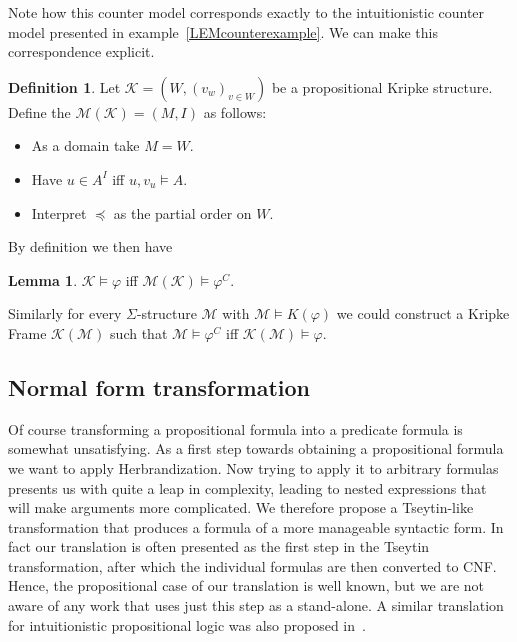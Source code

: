 \documentclass[a4paper,12pt]{report}
\theoremstyle{definition}
\theoremstyle{definition}
\theoremstyle{definition}
\newtheorem{lemma}[theorem]{Lemma}
\theoremstyle{definition}
\theoremstyle{definition}
\newtheorem{definition}[theorem]{Definition}
\theoremstyle{definition}
\theoremstyle{definition}
\begin{document}
	Note how this counter model corresponds exactly to the intuitionistic counter model presented in example~\ref{LEMcounterexample}. We can make this correspondence explicit.
	
	\begin{definition}
		Let $\mathcal K = (W, (v_w)_{v\in W})$ be a propositional Kripke structure. Define the $\mathcal M(\mathcal K) = (M, I)$ as follows:
		\begin{itemize}
			\item As a domain take $M = W$.
			\item Have $u\in A^{I}$ iff $u, v_u\models A$.
			\item Interpret $\preceq$ as the partial order on $W$.
		\end{itemize}
	\end{definition}

	\noindent By definition we then have
	\begin{lemma}
		$\mathcal K\models \varphi$ iff $\mathcal M(\mathcal K)\models \varphi^{C}$.
	\end{lemma}
	
	\indent Similarly for every $\Sigma$-structure $\mathcal M$ with $\mathcal M\models K(\varphi)$ we could construct a Kripke Frame $\mathcal K(\mathcal M)$ such that $\mathcal M\models \varphi^C$ iff $\mathcal K(\mathcal M)\models \varphi$.
	
	\subsection{Normal form transformation}
	
	Of course transforming a propositional formula into a predicate formula is somewhat unsatisfying. As a first step towards obtaining a propositional formula we want to apply Herbrandization. Now trying to apply it to arbitrary formulas presents us with quite a leap in complexity, leading to nested expressions that will make arguments more complicated. We therefore propose a Tseytin-like transformation that produces a formula of a more manageable syntactic form. In fact our translation is often presented as the first step in the Tseytin transformation, after which the individual formulas are then converted to CNF.
	Hence, the propositional case of our translation is well known, but we are not aware of any work that uses just this step as a stand-alone. A similar translation for intuitionistic propositional logic was also proposed in~\cite{statman1979intuitionistic}.
	
\end{document}

